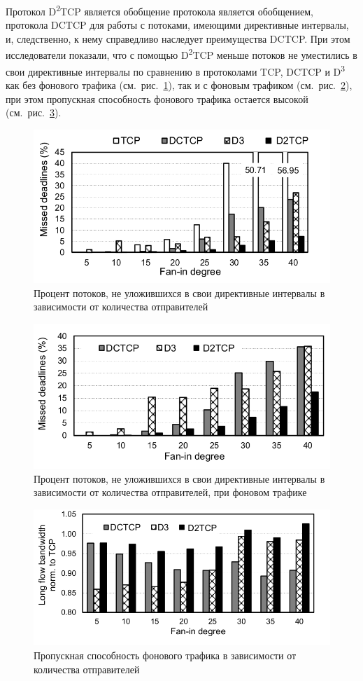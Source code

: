 \documentclass[14pt, a4paper,oneside]{extarticle}
\begin{document}
Протокол D\textsuperscript{2}TCP является обобщение протокола является обобщением, протокола DCTCP для работы с потоками, имеющими директивные интервалы, и, следственно, к нему справедливо наследует преимущества DCTCP. При этом исследователи показали, что с помощью D\textsuperscript{2}TCP меньше потоков не уместились в свои директивные интервалы по сравнению в протоколами TCP, DCTCP и D\textsuperscript{3} как без фонового трафика (см.~рис.~\ref{d2_missed_deadlines}), так и с фоновым трафиком (см.~рис.~\ref{d2_back_missed_deadlines}), при этом пропускная способность фонового трафика остается высокой (см.~рис.~\ref{d2_back_flows}).
\begin{figure}
	\includegraphics[width=0.7\linewidth]{d2_missed_deadlines}
	\caption{Процент потоков, не уложившихся в свои директивные интервалы в зависимости от количества отправителей}
	\label{d2_missed_deadlines}
\end{figure}

\begin{figure}
	\includegraphics[width=0.7\linewidth]{d2_back_missed_deadlines}
	\caption{Процент потоков, не уложившихся в свои директивные интервалы в зависимости от количества отправителей, при фоновом трафике}
	\label{d2_back_missed_deadlines}
\end{figure}

\begin{figure}
	\includegraphics[width=0.7\linewidth]{d2_back_flows}
	\caption{Пропускная способность фонового трафика в зависимости от количества отправителей}
	\label{d2_back_flows}
\end{figure}
\newpage
\end{document}
